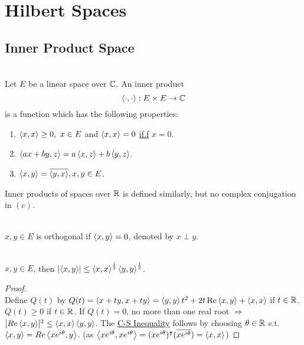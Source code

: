 \section{Hilbert Spaces}
\subsection{Inner Product Space}
\begin{definition}\ \\
Let $E$ be a linear space over $\mathbb{C}$. An inner product 
\begin{equation*}
\left\langle \cdot, \cdot \right\rangle: E \times E \to \mathbb{C}     
\end{equation*}
is a function which has the following properties:
\begin{enumerate}[label = (\alph*)]
    \item $\left\langle x, x \right\rangle \geq 0,\ x \in E$ and $\left\langle x, x \right\rangle = 0$ \underline{if.f} $x = 0$.
    \item $\left\langle ax + by, z \right\rangle = a\left\langle x, z \right\rangle + b \left\langle y, z \right\rangle$.
    \item $\left\langle x, y \right\rangle = \overline{\left\langle y, x \right\rangle}, x,y \in E$.
\end{enumerate}
\end{definition}
\begin{remark}
    Inner products of spaces over $\mathbb{R}$ is defined similarly, but no complex conjugation in $(c)$.
\end{remark}

\vspace{3pt}
\begin{definition}[Orthogonality]\ \\
$x,y \in E$ is orthogonal if $\left\langle x, y \right\rangle = 0$, denoted by $x \perp y$.
\end{definition}

\vspace{3pt}
\begin{theorem}\ \\
$x,y \in E$, then $\abs{\left\langle x, y \right\rangle} \leq \left\langle x, x \right\rangle^{\frac{1}{2}} \left\langle y, y \right\rangle^{\frac{1}{2}}$.
\end{theorem}
\begin{proof}\ \\
Define $Q(t)$ by $Q(t) = \left\langle x + ty, x + ty \right\rangle = \left\langle y, y \right\rangle t^2 + 2t \Re \left\langle x, y \right\rangle + \left\langle x, x \right\rangle$ if $t \in \mathbb{R}$. $Q(t) \geq 0$ if $t \in \mathbb{R}$. If $Q(t) = 0$, no more than one real root $\Rightarrow$ $[Re\left\langle x, y \right\rangle]^2 \leq \left\langle x, x \right\rangle \left\langle y, y \right\rangle$. The \underline{C-S Inequality} follows by choosing $\theta \in \mathbb{R}$ s.t. $\left\langle x, y \right\rangle = Re\left\langle x e^{i \theta}, y \right\rangle$. (as $\left\langle x e^{i \theta}, x e^{i \theta} \right\rangle = (x e^{i\theta})^\intercal (\overline{x e^{i\theta}}) = \left\langle x, x \right\rangle$)
\end{proof}

